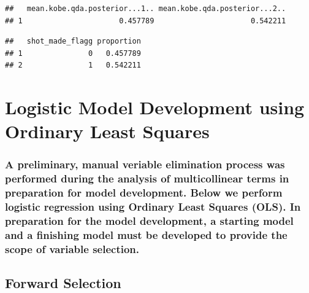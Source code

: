 \documentclass[]{article}
\begin{document}
\begin{verbatim}
##   mean.kobe.qda.posterior...1.. mean.kobe.qda.posterior...2..
## 1                      0.457789                      0.542211
\end{verbatim}

\begin{verbatim}
##   shot_made_flagg proportion
## 1               0   0.457789
## 2               1   0.542211
\end{verbatim}

\hypertarget{logistic-model-development-using-ordinary-least-squares}{%
\section{\texorpdfstring{\textbf{Logistic Model Development using
Ordinary Least
Squares}}{Logistic Model Development using Ordinary Least Squares}}\label{logistic-model-development-using-ordinary-least-squares}}

\hypertarget{a-preliminary-manual-veriable-elimination-process-was-performed-during-the-analysis-of-multicollinear-terms-in-preparation-for-model-development.-below-we-perform-logistic-regression-using-ordinary-least-squares-ols.-in-preparation-for-the-model-development-a-starting-model-and-a-finishing-model-must-be-developed-to-provide-the-scope-of-variable-selection.}{%
\subsubsection{A preliminary, manual veriable elimination process was
performed during the analysis of multicollinear terms in preparation for
model development. Below we perform logistic regression using Ordinary
Least Squares (OLS). In preparation for the model development, a
starting model and a finishing model must be developed to provide the
scope of variable
selection.}\label{a-preliminary-manual-veriable-elimination-process-was-performed-during-the-analysis-of-multicollinear-terms-in-preparation-for-model-development.-below-we-perform-logistic-regression-using-ordinary-least-squares-ols.-in-preparation-for-the-model-development-a-starting-model-and-a-finishing-model-must-be-developed-to-provide-the-scope-of-variable-selection.}}

\hypertarget{forward-selection}{%
\subsection{\texorpdfstring{\textbf{Forward
Selection}}{Forward Selection}}\label{forward-selection}}
\end{document}
